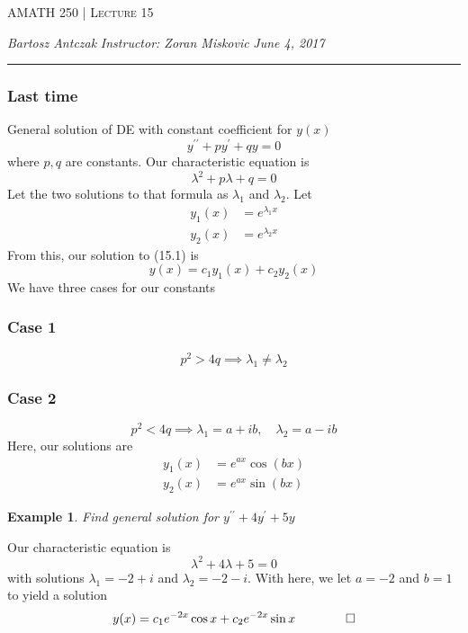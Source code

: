 \documentclass{report}
\newcommand{\lectureNum}{15}
\newcommand{\curDate}{June 4, 2017}
\newcommand{\course}{AMATH 250}
\newcommand{\instructor}{Zoran Miskovic}
\newtheorem{ex}{Example}[section]
\begin{document}
\begin{center}
\begin{Large}
\textsc{\course{} | Lecture \lectureNum{}}
\end{Large}
\end{center} 
\noindent \textit{Bartosz Antczak} \hfill
\textit{Instructor: \instructor{}} \hfill
\textit{\curDate{}}
\rule{\textwidth}{0.4pt}
\subsubsection{Last time}
General solution of DE with constant coefficient for $y(x)$
\begin{equation}
y^{\prime\prime} + py^\prime + qy = 0
\end{equation}
where $p, q$ are constants. Our characteristic equation is
$$\lambda^2 + p\lambda + q = 0$$
Let the two solutions to that formula as $\lambda_1$ and $\lambda_2$. Let
\begin{align*}
y_1(x) &= e^{\lambda_1x} \\
y_2(x) &= e^{\lambda_2x}
\end{align*}
From this, our solution to (15.1) is
$$y(x) = c_1y_1(x) + c_2y_2(x)$$
We have three cases for our constants
\subsubsection{Case 1}
$$p^2 > 4q \implies \lambda_1 \neq \lambda_2$$
\subsubsection{Case 2}
$$p^2 < 4q \implies \lambda_1 = a + ib, \quad \lambda_2 = a - ib$$
Here, our solutions are
\begin{align*}
y_1(x) &= e^{ax}\cos (bx) \\
y_2(x) &= e^{ax}\sin (bx)
\end{align*}
\begin{ex}
Find general solution for $y^{\prime\prime} + 4y^\prime + 5y$
\end{ex}\noindent
Our characteristic equation is
$$\lambda^2 +4\lambda + 5 = 0$$
with solutions $\lambda_1 = -2 + i$ and $\lambda_2 = -2 - i$. With here, we let $a = -2$ and $b=1$ to yield a solution
$$y(x) = c_1e^{-2x}\cos x + c_2e^{-2x}\sin x \qquad \qed$$
\end{document}
